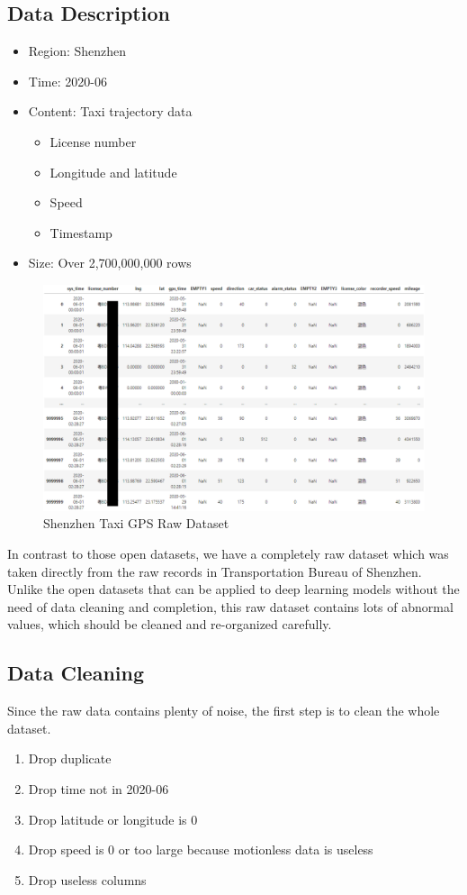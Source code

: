 \documentclass[fontset=none]{ctexart}
\theoremstyle{definition}
\theoremstyle{remark}
\begin{document}
\subsection{Data Description}
\begin{itemize}
  \item Region: Shenzhen
  \item Time: 2020-06
  \item Content: Taxi trajectory data
    \begin{itemize}
      \item License number
      \item Longitude and latitude
      \item Speed
      \item Timestamp
    \end{itemize}
  \item Size: Over 2,700,000,000 rows
\end{itemize}

\begin{figure}[htb]
  \centering
  \includegraphics[width=\textwidth]{images/mid/2-1.png}
  \caption{Shenzhen Taxi GPS Raw Dataset}
  \label{fig: 2-1}
\end{figure}

In contrast to those open datasets, we have a completely raw dataset which was taken directly
from the raw records in Transportation Bureau of Shenzhen. Unlike the open datasets that can be
applied to deep learning models without the need of data cleaning and completion, this raw dataset
contains lots of abnormal values, which should be cleaned and re-organized carefully.

\subsection{Data Cleaning}
Since the raw data contains plenty of noise, the first step is to clean the whole dataset.
\begin{enumerate}
  \item Drop duplicate
  \item Drop time not in 2020-06
  \item Drop latitude or longitude is 0
  \item Drop speed is 0 or too large because motionless data is useless
  \item Drop useless columns
\end{enumerate}
\end{document}
